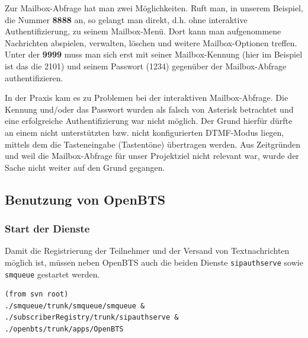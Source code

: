 \begin{itemize}
\begin{enumerate}
Zur Mailbox-Abfrage hat man zwei Möglichkeiten. Ruft man, in unserem Beispiel, die Nummer \textbf{8888} an, so gelangt man direkt, d.h. ohne interaktive Authentifizierung, zu seinem Mailbox-Menü. Dort kann man aufgenommene Nachrichten abspielen, verwalten, löschen und weitere Mailbox-Optionen treffen. Unter der \textbf{9999} muss man sich erst mit seiner Mailbox-Kennung (hier im Beispiel ist das die 2101) und seinem Passwort (1234) gegenüber der Mailbox-Abfrage authentifizieren.

In der Praxis kam es zu Problemen bei der interaktiven Mailbox-Abfrage. Die Kennung und/oder das Passwort wurden als falsch von Asterisk betrachtet und eine erfolgreiche Authentifizierung war nicht möglich. Der Grund hierfür dürfte an einem nicht unterstützten bzw. nicht konfigurierten DTMF-Modus liegen, mittels dem die Tasteneingabe (Tastentöne) übertragen werden. Aus Zeitgründen und weil die Mailbox-Abfrage für unser Projektziel nicht relevant war, wurde der Sache nicht weiter auf den Grund gegangen.
\end{enumerate}
\end{itemize} 

\subsection{Benutzung von OpenBTS}
\subsubsection{Start der Dienste}
Damit die Registrierung der Teilnehmer und der Versand von Textnachrichten möglich ist, müssen neben OpenBTS auch die beiden Dienste \verb|sipauthserve| sowie \verb|smqueue| gestartet werden.
\begin{verbatim}
(from svn root)
./smqueue/trunk/smqueue/smqueue &
./subscriberRegistry/trunk/sipauthserve &
./openbts/trunk/apps/OpenBTS
\end{verbatim}

